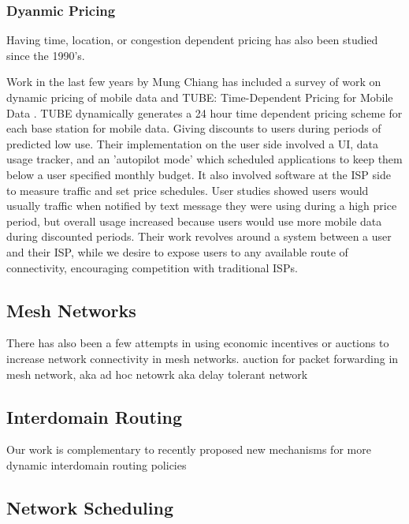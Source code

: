 \subsubsection{Dyanmic Pricing}
Having time, location, or congestion dependent pricing has also been studied since the 1990's.


Work in the last few years by Mung Chiang has included a survey of work on dynamic pricing of mobile data \cite{pricingdata13} and TUBE: Time-Dependent Pricing for Mobile Data \cite{tube12}.
TUBE dynamically generates a 24 hour time dependent pricing scheme for each base station for mobile data. Giving discounts to users during periods of predicted low use.
Their implementation on the user side involved a UI, data usage tracker, and an 'autopilot mode' which scheduled applications to keep them below a user specified monthly budget. It also involved software at the ISP side to measure traffic and set price schedules.
User studies showed users would usually traffic when notified by text message they were using during a high price period, but overall usage increased because users would use more mobile data during discounted periods.
Their work revolves around a system between a user and their ISP, while we desire to expose users to any available route of connectivity, encouraging competition with traditional ISPs.

\subsection{Mesh Networks}
There has also been a few attempts in using economic incentives or auctions to increase network connectivity in mesh networks.
auction for packet forwarding in mesh network, aka ad hoc netowrk \cite{anderegg03, chen04, chen05, wang06, demir07,zhong07, kargar08, zhu08, eidenbenz08, wu10, zhong10, martignon11, martignon15} aka delay tolerant network \cite{chen13}



\subsection{Interdomain Routing}
Our work is complementary to recently proposed new mechanisms for more dynamic interdomain routing policies



\subsection{Network Scheduling}
